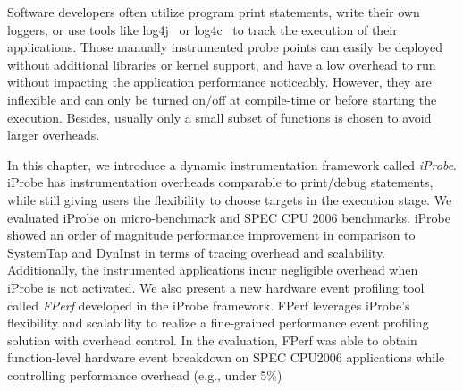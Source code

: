 Software developers often utilize program print statements, write their own loggers, or use tools like log4j~\cite{log4j} or log4c~\cite{log4c} to track the execution of their applications.
Those manually instrumented probe points can easily be deployed without additional libraries or kernel support, and have a low overhead to run without impacting the application performance noticeably. 
However, they are inflexible and can only be turned on/off at compile-time or before starting the execution. 
Besides, usually only a small subset of functions is chosen to avoid larger overheads.

In this chapter, we introduce a dynamic instrumentation framework called \emph{iProbe}.
iProbe has instrumentation overheads comparable to print/debug statements, while still giving users the flexibility to choose targets in the execution stage. 
We evaluated iProbe on micro-benchmark and SPEC CPU 2006 benchmarks.
iProbe showed an order of magnitude performance improvement in comparison to SystemTap\cite{utrace} and DynInst\cite{dyninst} in terms of tracing overhead and scalability.
Additionally, the instrumented applications incur negligible overhead when iProbe is not activated.
We also present a new hardware event profiling tool called \emph{FPerf} developed in the iProbe framework.  
FPerf leverages iProbe's flexibility and scalability to realize a fine-grained performance event profiling solution with overhead control.
In the evaluation, FPerf was able to obtain function-level hardware event breakdown on SPEC CPU2006 applications while controlling performance overhead (e.g., under 5\%)




